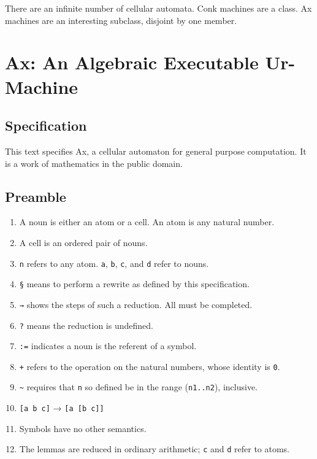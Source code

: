 \documentclass[twoside]{article}
\begin{document}
There are an infinite number of cellular automata. Conk machines are a class. Ax machines are an interesting subclass, disjoint by one member.

\section{Ax:  An Algebraic Executable Ur-Machine}

\subsection{Specification}

This text specifies Ax, a cellular automaton for general purpose computation.  It is a work of mathematics in the public domain.

\subsection*{Preamble}

\begin{enumerate}
  \item  A noun is either an atom or a cell. An atom is any natural number.
  \item  A cell is an ordered pair of nouns.
  \item  \lstinline[style=inlinecode]{n} refers to any atom. \lstinline[style=inlinecode]{a}, \lstinline[style=inlinecode]{b}, \lstinline[style=inlinecode]{c}, and \lstinline[style=inlinecode]{d} refer to nouns.
  \item  \lstinline[style=inlinecode]{§} means to perform a rewrite as defined by this specification.
  \item  \texttt{→}  shows the steps of such a reduction. All must be completed.
  \item  \lstinline[style=inlinecode]{?}  means the reduction is undefined.
  \item  \lstinline[style=inlinecode]{:=} indicates a noun is the referent of a symbol.
  \item  \lstinline[style=inlinecode]{+}  refers to the operation on the natural numbers, whose identity is \texttt{0}.
  \item  \lstinline[style=inlinecode]{~}  requires that \lstinline[style=inlinecode]{n} so defined be in the range (\lstinline[style=inlinecode]{n1..n2}), inclusive.
  \item  \lstinline[style=inlinecode]{[a b c]} → \lstinline[style=inlinecode]{[a [b c]]}
  \item  Symbols have no other semantics.
  \item  The lemmas are reduced in ordinary arithmetic; \lstinline[style=inlinecode]{c} and \lstinline[style=inlinecode]{d} refer to atoms.
\end{enumerate}
\end{document}
